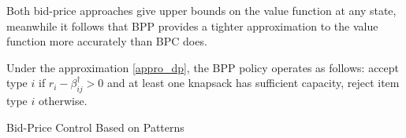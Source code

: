     
Both bid-price approaches give upper bounds on the value function at any state, meanwhile it follows that BPP provides a tighter approximation to the value function more accurately than BPC does.

Under the approximation \eqref{appro_dp}, the BPP policy operates as follows: accept type $i$ if $r_i - \beta_{ij}^{\dag} > 0$ and at least one knapsack has sufficient capacity, reject item type $i$ otherwise. 


\begin{algorithm}[H]
    \caption{Bid-Price Control Based on Patterns}\label{algo_improve_bid}
\end{algorithm}



